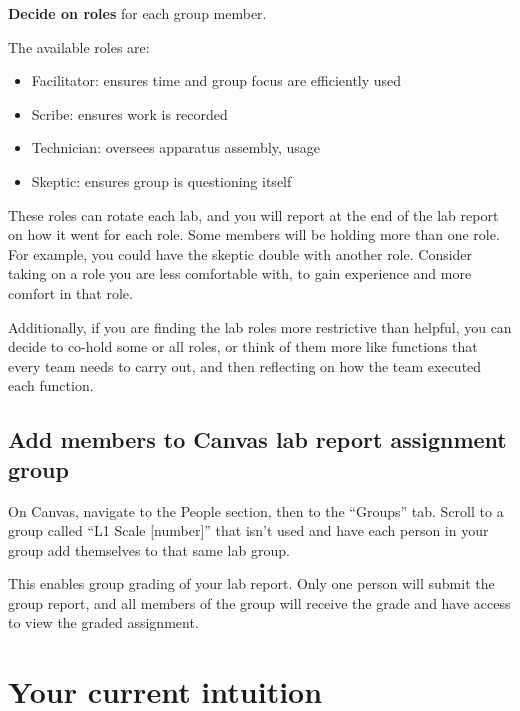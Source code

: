 \begin{steps}
	\item \textbf{Decide on roles} for each group member.
\end{steps}

The available roles are:
\begin{itemize}
	\item Facilitator: ensures time and group focus are efficiently used
	\item Scribe: ensures work is recorded
	\item Technician: oversees apparatus assembly, usage
	\item Skeptic: ensures group is questioning itself
\end{itemize}

These roles can rotate each lab, and you will report at the end of the lab report on how it went for each role. Some members will be holding more than one role. For example, you could have the skeptic double with another role. Consider taking on a role you are less comfortable with, to gain experience and more comfort in that role.

Additionally, if you are finding the lab roles more restrictive than helpful, you can decide to co-hold some or all roles, or think of them more like functions that every team needs to carry out, and then reflecting on how the team executed each function.

\subsection{Add members to Canvas lab report assignment group}

\begin{steps}
	\item On Canvas, navigate to the People section, then to the ``Groups'' tab. Scroll to a group called ``L1 Scale [number]'' that isn't used and have each person in your group add themselves to that same lab group.
\end{steps}

This enables group grading of your lab report. Only one person will submit the group report, and all members of the group will receive the grade and have access to view the graded assignment.

\section{Your current intuition}\label{se:sec:intuition}

